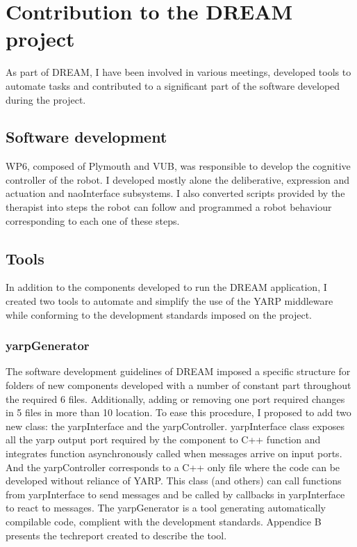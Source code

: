 \chapter{Contribution to the DREAM project} \label{app:dream}

As part of DREAM, I have been involved in various meetings, developed tools to automate tasks and contributed to a significant part of the software developed during the project.

\section{Software development}

WP6, composed of Plymouth and VUB, was responsible to develop the cognitive controller of the robot. I developed mostly alone the deliberative, expression and actuation and naoInterface subsystems. I also converted scripts provided by the therapist into steps the robot can follow and programmed a robot behaviour corresponding to each one of these steps.


\section{Tools}

In addition to the components developed to run the DREAM application, I created two tools to automate and simplify the use of the YARP middleware while conforming to the development standards imposed on the project.

\subsection{yarpGenerator}

The software development guidelines of DREAM imposed a specific structure for folders of new components developed with a number of constant part throughout the required 6 files. Additionally, adding or removing one port required changes in 5 files in more than 10 location. To ease this procedure, I proposed to add two new class: the yarpInterface and the yarpController. yarpInterface class exposes all the yarp output port required by the component to C++ function and integrates function asynchronously called when messages arrive on input ports. And the yarpController corresponds to a C++ only file where the code can be developed without reliance of YARP. This class (and others) can call functions from yarpInterface to send messages and be called by callbacks in yarpInterface to react to messages. The yarpGenerator is a tool generating automatically compilable code, complient with the development standards. Appendice B presents the techreport created to describe the tool.

